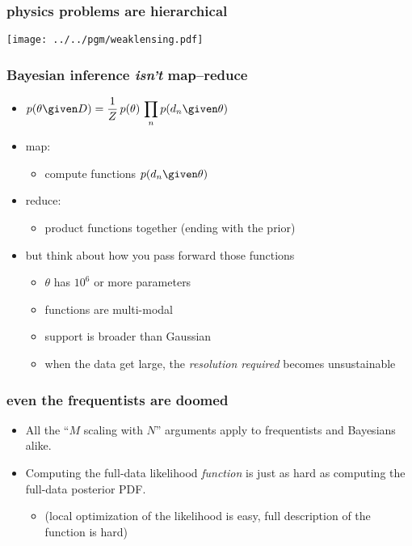 \documentclass[pdftex]{beamer}
\begin{document}
\begin{frame}
  \frametitle{physics problems are hierarchical}
  \texttt{[image: ../../pgm/weaklensing.pdf]}
\end{frame}

\begin{frame}
  \frametitle{Bayesian inference \emph{isn't} map--reduce}
  \begin{itemize}
  \item $\displaystyle p(\theta\given D) = \frac{1}{Z}\,p(\theta)\,\prod_n p(d_n\given\theta)$
  \item map:
    \begin{itemize}
    \item compute functions $p(d_n\given\theta)$
    \end{itemize}
  \item reduce:
    \begin{itemize}
    \item product functions together (ending with the prior)
    \end{itemize}
  \item but think about how you pass forward those functions
    \begin{itemize}
    \item $\theta$ has $10^6$ or more parameters
    \item functions are multi-modal
    \item support is broader than Gaussian
    \item when the data get large, the \emph{resolution required} becomes unsustainable
    \end{itemize}
  \end{itemize}
\end{frame}

\begin{frame}
  \frametitle{even the frequentists are doomed}
  \begin{itemize}
  \item All the ``$M$ scaling with $N$'' arguments apply to frequentists and Bayesians alike.
  \item Computing the full-data likelihood \emph{function} is just as hard as computing the full-data posterior PDF.
    \begin{itemize}
    \item (local optimization of the likelihood is easy, full description of the function is hard)
    \end{itemize}
  \end{itemize}
\end{frame}
\end{document}

